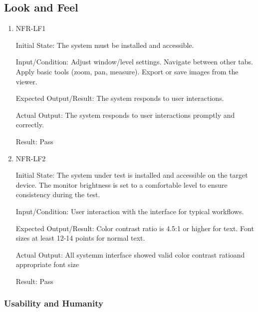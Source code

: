 \documentclass[12pt, titlepage]{article}
\begin{document}
\subsection{Look and Feel}
\begin{enumerate}

\item{NFR-LF1\\}\label{NFR-LF1}

Initial State: The system must be installed and accessible.

Input/Condition: Adjust window/level settings. Navigate between other tabs. Apply basic tools (zoom, pan, measure). Export or save images from the viewer.

Expected Output/Result: The system responds to user interactions.

Actual Output: The system responds to user interactions promptly and correctly.

Result: Pass

\item{NFR-LF2\\}\label{NFR-LF2}

Initial State: The system under test is installed and accessible on the target device. The monitor brightness is set to a comfortable level to ensure consistency during the test.

Input/Condition: User interaction with the interface for typical workflows.

Expected Output/Result: Color contrast ratio is 4.5:1 or higher for text. Font sizes at least 12-14 points for normal text.

Actual Output: All systemm interface showed valid color contrast ratioand appropriate font size 

Result: Pass

\end{enumerate}

\subsubsection{Usability and Humanity}
\end{document}
